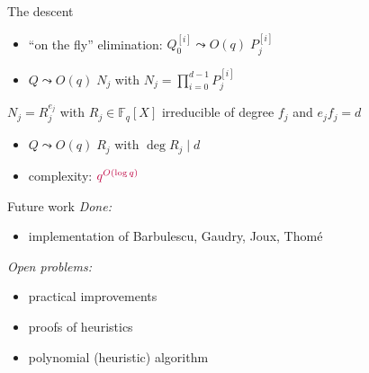 \documentclass[xcolor=x11names,compress]{beamer}
\theoremstyle{break}
\theoremstyle{sc}
\theoremstyle{definition}
\theoremstyle{remark}
\begin{document}
\begin{frame}{The descent}
  \begin{itemize}
    \item ``on the fly'' elimination: $Q_0^{[i]}\leadsto O(q)\;P_j^{[i]}$
    \item $Q\leadsto O(q)\;N_j$ with $N_j=\prod_{i=0}^{d-1}P_j^{[i]}$
  \end{itemize}
  
  $N_j = R_j^{e_{j}}$ with $R_j\in \mathbb{F}_q[X]$ irreducible of degree
  $f_{j}$ and $e_{j}f_{j} = d$
  \begin{itemize}
    \item $Q\leadsto O(q)\;R_j$ with $\deg R_j \;|\;d$
    \item complexity: $\textcolor{purple}{q^{O(\log q)}}$
  \end{itemize}
\end{frame}

\begin{frame}{Future work}
  \emph{Done:}
  \begin{itemize}
    \item implementation of Barbulescu, Gaudry, Joux, Thomé
  \end{itemize}
  \emph{Open problems:}
  \begin{itemize}
    \item practical improvements
    \item proofs of heuristics
    \item polynomial (heuristic) algorithm
  \end{itemize}

\end{frame}

\end{document}
